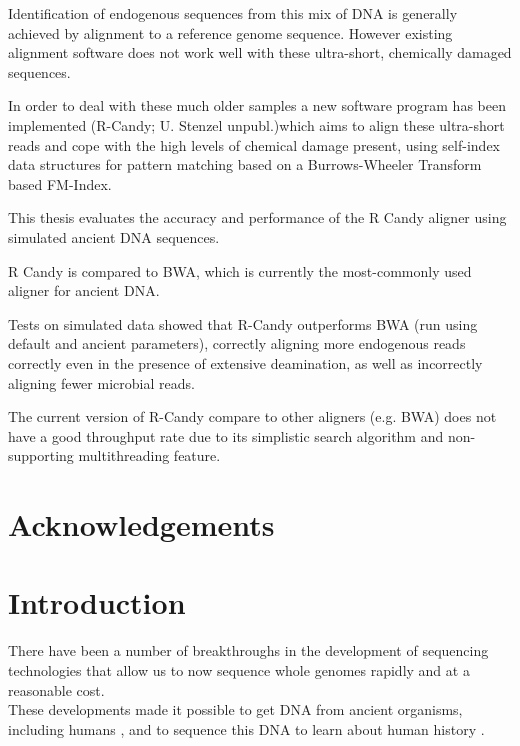 \documentclass[11pt,a4paper]{report}
\begin{document}
Identification of endogenous sequences from this mix of DNA is generally achieved by
alignment to a reference genome sequence. 
However existing alignment software does not work well with these ultra-short, 
chemically damaged sequences.

In order to deal with these much older samples a new software program has been implemented
(R-Candy; U. Stenzel unpubl.)which aims to align these ultra-short reads and cope with the high 
levels of chemical damage present, using self-index data structures for pattern matching
based on a Burrows-Wheeler Transform based FM-Index.


This thesis evaluates the accuracy and performance of the R Candy aligner using 
simulated ancient DNA sequences. 

R Candy is compared to BWA, which is currently the most-commonly used aligner for ancient DNA.

Tests on simulated data showed that R-Candy outperforms BWA (run using default 
and ancient parameters), correctly aligning more endogenous reads correctly even
in the presence of extensive deamination, as well as incorrectly aligning fewer
microbial reads.

The current version of R-Candy compare to other aligners (e.g. BWA) does not have a good 
throughput rate due to its simplistic search algorithm and non-supporting multithreading feature. 

\newpage\null\thispagestyle{empty}\newpage
\section*{Acknowledgements}
\newpage\null\thispagestyle{empty}\newpage

\tableofcontents
\newpage
\listoftables
\newpage
\listoffigures
\newpage




\section{Introduction} \label{Introduction}


There have been a number of breakthroughs in the development of sequencing 
technologies that allow us to now sequence whole genomes rapidly and at a 
reasonable cost\cite{NGS}\cite{454}\cite{NGS2}.
\\
These developments made it possible to get DNA from ancient organisms, 
including humans \cite{AncientDNA}\cite{fish2human}, and to sequence 
this DNA to learn about human history\cite{impactOFhg}\cite{ourGenome}
\cite{SNP}.
\end{document}
